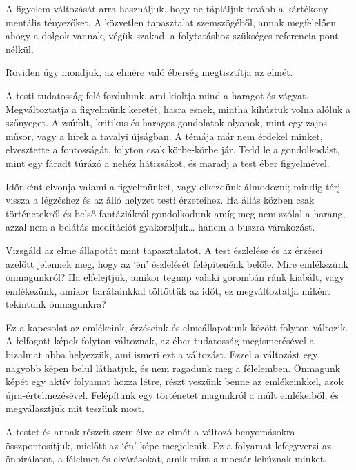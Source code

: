 A figyelem változását arra használjuk, hogy ne tápláljuk tovább a
kártékony mentális tényezőket. A közvetlen tapasztalat szemszögéből,
annak megfelelően ahogy a dolgok vannak, végük szakad, a folytatáshoz
szükséges referencia pont nélkül.

Röviden úgy mondjuk, az elmére való éberség megtisztítja az elmét.

A testi tudatosság felé fordulunk, ami kioltja mind a haragot és vágyat.
Megváltoztatja a figyelmünk keretét, hasra esnek, mintha kihúztuk volna
alóluk a szőnyeget. A zsúfolt, kritikus és haragos gondolatok olyanok,
mint egy zajos műsor, vagy a hírek a tavalyi újságban. A témája már nem
érdekel minket, elvesztette a fontosságát, folyton csak körbe-körbe jár.
Tedd le a gondolkodást, mint egy fáradt túrázó a nehéz hátizsákot, és
maradj a test éber figyelmével.

Időnként elvonja valami a figyelmünket, vagy elkezdünk álmodozni; mindig
térj vissza a légzéshez és az álló helyzet testi érzeteihez. Ha állás
közben csak történetekről és belső fantáziákról gondolkodunk amíg meg
nem szólal a harang, azzal nem a belátás meditációt gyakoroljuk\ldots{}
hanem a buszra várakozást.


Vizsgáld az elme állapotát mint tapasztalatot. A test észlelése és az
érzései azelőtt jelennek meg, hogy az `én' észlelését felépítenénk
belőle. Mire emlékszünk önmagunkról? Ha elfelejtjük, amikor tegnap
valaki gorombán ránk kiabált, vagy emlékezünk, amikor barátainkkal
töltöttük az időt, ez megváltoztatja miként tekintünk önmagunkra?

Ez a kapcsolat az emlékeink, érzéseink és elmeállapotunk között folyton
változik. A felfogott képek folyton változnak, az éber tudatosság
megismerésével a bizalmat abba helyezzük, ami ismeri ezt a változást.
Ezzel a változást egy nagyobb képen belül láthatjuk, és nem ragadunk meg
a félelemben. Önmagunk képét egy aktív folyamat hozza létre, részt
veszünk benne az emlékeinkkel, azok újra-értelmezésével. Felépítünk egy
történetet magunkról a múlt emlékeiből, és megválasztjuk mit teszünk
most.


A testet és annak részeit szemlélve az elmét a változó benyomásokra
összpontosítjuk, mielőtt az `én' képe megjelenik. Ez a folyamat
lefegyverzi az önbírálatot, a félelmet és elvárásokat, amik mint a
mocsár lehúznak minket.

